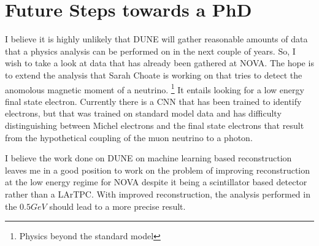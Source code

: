 \section{Future Steps towards a PhD}

I believe it is highly unlikely that DUNE will gather reasonable amounts of data that a physics analysis can be performed on in the next couple of years.
So, I wish to take a look at data that has already been gathered at NOVA.
The hope is to extend the analysis that Sarah Choate is working on that tries to detect  the anomolous magnetic moment of a neutrino.
\footnote{Physics beyond the standard model}
It entails looking for a low energy final state electron.
Currently there is a CNN that has been trained to identify electrons, but that was trained on standard model data and has difficulty distinguishing between Michel electrons and the final state electrons that result from the hypothetical coupling of the muon neutrino to a photon.

I believe the work done on DUNE on machine learning based reconstruction leaves me in a good position to work on the problem of improving reconstruction at the low energy regime for NOVA despite it being a scintillator based detector rather than a LArTPC.
With improved reconstruction, the analysis performed in the $0.5GeV$  should lead to a more precise result.